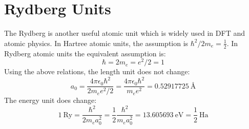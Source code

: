 \section{Rydberg Units}
The Rydberg is another useful atomic unit which is widely used in DFT and atomic physics. In Hartree atomic units, the assumption is $\hbar^2/2m_e = \frac{1}{2}$. In Rydberg atomic units the equivalent assumption is: 
\begin{equation*}
\hbar = 2m_e = e^2/2 = 1
\end{equation*}
Using the above relations, the length unit does not change:
\begin{equation}
a_0 = \frac{4\pi\epsilon_0 \hbar^2}{2m_ee^2/2} = \frac{4\pi\epsilon_0 \hbar^2}{m_ee^2} = 0.52917725~\si{\angstrom}
\end{equation}
The energy unit does change:
\begin{equation}
1\ \text{Ry} =  \frac{\hbar^2}{2m_ea_0^2} = \frac{1}{2} \frac{\hbar^2}{m_ea_0^2} = 13.605693\  \text{eV} = \frac{1}{2}~\mathrm{Ha}
\end{equation}










%
